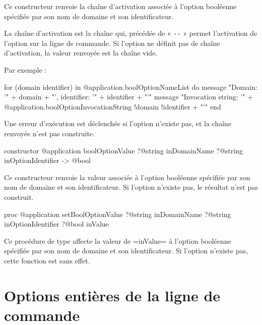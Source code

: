 Ce constructeur renvoie la chaîne d'activation associée à l'option booléenne spécifiée par son nom de domaine et son identificateur.

La chaîne d'activation est la chaîne qui, précédée de « \texttt{-{}-} » permet l'activation de l'option sur la ligne de commande. Si l'option ne définit pas de chaîne d'activation, la valeur renvoyée est la chaîne vide.

 Par exemple :
\begin{galgas4}
for (domain identifier) in @application.boolOptionNameList do
  message "Domain: '" + domain + "', identifier: '" + identifier + "'\n"
  message "Invocation string: '"
    + @application.boolOptionInvocationString {!domain !identifier} + "'\n"
end
\end{galgas4}

Une erreur d'exécution est déclenchée si l'option n'existe pas, et la chaîne renvoyée n'est pas construite.







\begin{galgas4box}
constructor @application boolOptionValue
    ?@string inDomainName
    ?@string inOptionIdentifier -> @bool
\end{galgas4box}

Ce constructeur renvoie la valeur associée à l'option booléenne spécifiée par son nom de domaine et son identificateur. Si l'option n'existe pas, le résultat n'est pas construit.






\begin{galgas4box}
proc @application setBoolOptionValue
    ?@string inDomainName
    ?@string inOptionIdentifier
    ?@bool inValue
\end{galgas4box}

Ce procédure de type affecte la valeur de \ggsq=inValue= à l'option booléenne spécifiée par son nom de domaine et son identificateur. Si l'option n'existe pas, cette fonction est sans effet.







\section{Options entières de la ligne de commande}

